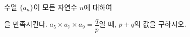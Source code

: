 \hspace*{2mm}\begin{minipage}[t]{\dimexpr\linewidth-2mm\relax}\vspace{0pt}
수열 $\{a_n\}$이 모든 자연수 $n$에 대하여 \par\smallskip{}\par\smallskip\noindent 을 만족시킨다. $a_5\times a_7\times a_9=\dfrac{q}{p}$일 때, $p+q$의 값을 구하시오. \end{minipage}
